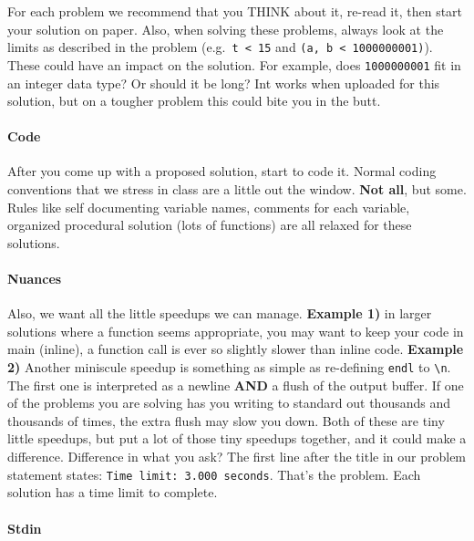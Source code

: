 For each problem we recommend that you THINK about it, re-read it, then
start your solution on paper. Also, when solving these problems, always
look at the limits as described in the problem
(e.g.~\texttt{t\ \textless{}\ 15} and
\texttt{(\textbar{}a\textbar{},\ \textbar{}b\textbar{}\ \textless{}\ 1000000001)}).
These could have an impact on the solution. For example, does
\texttt{1000000001} fit in an integer data type? Or should it be long?
Int works when uploaded for this solution, but on a tougher problem this
could bite you in the butt.

\hypertarget{code}{%
\paragraph{Code}\label{code}}

After you come up with a proposed solution, start to code it. Normal
coding conventions that we stress in class are a little out the window.
\textbf{Not all}, but some. Rules like self documenting variable names,
comments for each variable, organized procedural solution (lots of
functions) are all relaxed for these solutions.

\hypertarget{nuances}{%
\paragraph{Nuances}\label{nuances}}

Also, we want all the little speedups we can manage. \textbf{Example 1)}
in larger solutions where a function seems appropriate, you may want to
keep your code in main (inline), a function call is ever so slightly
slower than inline code. \textbf{Example 2)} Another miniscule speedup
is something as simple as re-defining \texttt{endl} to
\texttt{\textbackslash{}n}. The first one is interpreted as a newline
\textbf{AND} a flush of the output buffer. If one of the problems you
are solving has you writing to standard out thousands and thousands of
times, the extra flush may slow you down. Both of these are tiny little
speedups, but put a lot of those tiny speedups together, and it could
make a difference. Difference in what you ask? The first line after the
title in our problem statement states:
\texttt{Time\ limit:\ 3.000\ seconds}. That's the problem. Each solution
has a time limit to complete.

\hypertarget{stdin}{%
\paragraph{Stdin}\label{stdin}}

